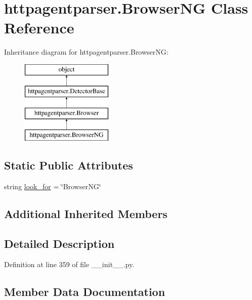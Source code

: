 \hypertarget{classhttpagentparser_1_1_browser_n_g}{}\section{httpagentparser.\+Browser\+NG Class Reference}
\label{classhttpagentparser_1_1_browser_n_g}
Inheritance diagram for httpagentparser.\+Browser\+NG\+:\begin{figure}[H]
\begin{center}
\leavevmode
\includegraphics[height=4.000000cm]{classhttpagentparser_1_1_browser_n_g}
\end{center}
\end{figure}
\subsection*{Static Public Attributes}
\begin{DoxyCompactItemize}
\item 
string \hyperlink{classhttpagentparser_1_1_browser_n_g_a765f40b140205111a2eee456d0ccec4f}{look\+\_\+for} = \char`\"{}Browser\+NG\char`\"{}
\end{DoxyCompactItemize}
\subsection*{Additional Inherited Members}


\subsection{Detailed Description}


Definition at line 359 of file \+\_\+\+\_\+init\+\_\+\+\_\+.\+py.



\subsection{Member Data Documentation}
\hypertarget{classhttpagentparser_1_1_browser_n_g_a765f40b140205111a2eee456d0ccec4f}{}\label{classhttpagentparser_1_1_browser_n_g_a765f40b140205111a2eee456d0ccec4f} 
